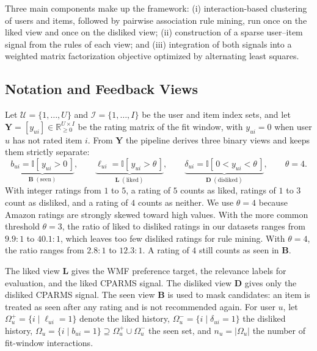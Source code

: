 \documentclass[pdflatex,sn-vancouver-num]{sn-jnl}%
\theoremstyle{thmstyleone}%
\theoremstyle{thmstyletwo}%
\theoremstyle{thmstylethree}%
\begin{document}
Three main components make up the framework: (i) interaction-based clustering of users and items, followed by pairwise association rule mining, run once on the liked view and once on the disliked view; (ii) construction of a sparse user--item signal from the rules of each view; and (iii) integration of both signals into a weighted matrix factorization objective optimized by alternating least squares.

\subsection{Notation and Feedback Views}

Let $\mathcal{U}=\{1,\ldots,U\}$ and $\mathcal{I}=\{1,\ldots,I\}$ be the user and item index sets, and let $\mathbf{Y}=[y_{ui}] \in \mathbb{R}_{\ge 0}^{U \times I}$ be the rating matrix of the fit window, with $y_{ui}=0$ when user $u$ has not rated item $i$. From $\mathbf{Y}$ the pipeline derives three binary views and keeps them strictly separate:
\begin{equation}
\underbrace{b_{ui} = \mathbb{I}\!\left[\, y_{ui} > 0 \,\right]}_{\textstyle \mathbf{B}\;(\text{seen})},
\qquad
\underbrace{\ell_{ui} = \mathbb{I}\!\left[\, y_{ui} > \theta \,\right]}_{\textstyle \mathbf{L}\;(\text{liked})},
\qquad
\underbrace{\delta_{ui} = \mathbb{I}\!\left[\, 0 < y_{ui} < \theta \,\right]}_{\textstyle \mathbf{D}\;(\text{disliked})},
\qquad \theta=4.
\label{eq:binary}
\end{equation}
With integer ratings from $1$ to $5$, a rating of $5$ counts as liked, ratings of $1$ to $3$ count as disliked, and a rating of $4$ counts as neither. We use $\theta=4$ because Amazon ratings are strongly skewed toward high values. With the more common threshold $\theta=3$, the ratio of liked to disliked ratings in our datasets ranges from $9.9{:}1$ to $40.1{:}1$, which leaves too few disliked ratings for rule mining. With $\theta=4$, the ratio ranges from $2.8{:}1$ to $12.3{:}1$. A rating of $4$ still counts as seen in $\mathbf{B}$.

The liked view $\mathbf{L}$ gives the WMF preference target, the relevance labels for evaluation, and the liked CPARMS signal. The disliked view $\mathbf{D}$ gives only the disliked CPARMS signal. The seen view $\mathbf{B}$ is used to mask candidates: an item is treated as seen after any rating and is not recommended again. For user $u$, let $\Omega_u^{+}=\{i \mid \ell_{ui}=1\}$ denote the liked history, $\Omega_u^{-}=\{i \mid \delta_{ui}=1\}$ the disliked history, $\Omega_u=\{i \mid b_{ui}=1\} \supseteq \Omega_u^{+}\cup\Omega_u^{-}$ the seen set, and $n_u=|\Omega_u|$ the number of fit-window interactions.
\end{document}
